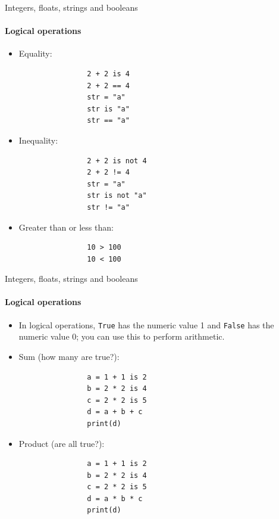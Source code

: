 \documentclass[notes,11pt, aspectratio=169, xcolor=table]{beamer}
\begin{document}
    \begin{frame}[fragile=singleslide]{Integers, floats, strings and booleans}
    \framesubtitle{Logical operations}

        \begin{itemize}
            \item Equality:
                \begin{verbatim}
                2 + 2 is 4
                2 + 2 == 4
                str = "a"
                str is "a"
                str == "a"
                \end{verbatim}    
            \item Inequality:
                \begin{verbatim}
                2 + 2 is not 4
                2 + 2 != 4
                str = "a"
                str is not "a"
                str != "a"
                \end{verbatim}    
            \item Greater than or less than:
                \begin{verbatim}
                10 > 100
                10 < 100
                \end{verbatim}    
        \end{itemize}

    \end{frame}              
    
        \begin{frame}[fragile=singleslide]{Integers, floats, strings and booleans}
    \framesubtitle{Logical operations}

        \begin{itemize}
            \item In logical operations, \texttt{True} has the numeric value 1 and \texttt{False} has the numeric value 0; you can use this to perform arithmetic.
            \item Sum (how many are true?):
                \begin{verbatim}
                a = 1 + 1 is 2
                b = 2 * 2 is 4
                c = 2 * 2 is 5
                d = a + b + c
                print(d)
                \end{verbatim}    
            \item Product (are all true?):
                \begin{verbatim}
                a = 1 + 1 is 2
                b = 2 * 2 is 4
                c = 2 * 2 is 5
                d = a * b * c
                print(d)
                \end{verbatim}    
        \end{itemize}

    \end{frame}              
    
\end{document}
